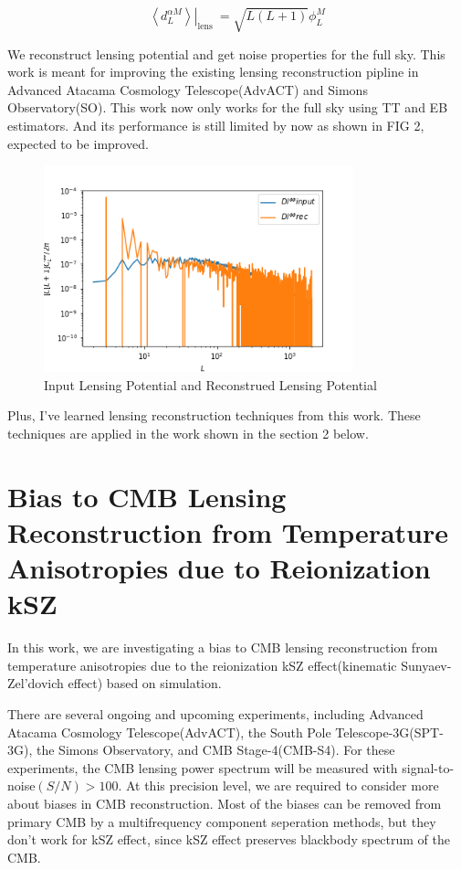 \documentclass[12pt, notitlepage, onecolumn, amsmath, amssymb, aps]{revtex4-1}
\begin{document}
\begin{equation}
  \left.\left\langle d_{L}^{\alpha M}\right\rangle\right|_{\text {lens }}=\sqrt{L(L+1)} \phi_{L}^{M}
\end{equation}

We reconstruct lensing potential and get noise properties for the full sky. This work is meant for improving the existing lensing reconstruction pipline in Advanced Atacama Cosmology Telescope(AdvACT) and Simons Observatory(SO). This work now only works for the full sky using TT and EB estimators. And its performance is still limited by now as shown in FIG 2, expected to be improved.

\begin{figure}[h]
\includegraphics[width=0.8\textwidth]{Dl_phiphi_rec.png}
\caption{Input Lensing Potential and Reconstrued Lensing Potential}
\end{figure}

Plus, I've learned lensing reconstruction techniques from this work. These techniques are applied in the work shown in the section 2 below.



\section{Bias to CMB Lensing Reconstruction from Temperature Anisotropies due to Reionization kSZ}
\label{sec:org093d799}
In this work, we are investigating a bias to CMB lensing reconstruction from temperature anisotropies due to the reionization kSZ effect(kinematic Sunyaev-Zel'dovich effect) based on simulation.

There are several ongoing and upcoming experiments, including Advanced Atacama Cosmology Telescope(AdvACT)\cite{Henderson:2015nzj}, the South Pole Telescope-3G(SPT-3G)\cite{Benson:2014qhw}, the Simons Observatory\cite{Ade:2018sbj}, and CMB Stage-4(CMB-S4)\cite{Abazajian:2016yjj}. For these experiments, the CMB lensing power spectrum will be measured with signal-to-noise\((S/N)>100\). At this precision level, we are required to consider more about biases in CMB reconstruction. Most of the biases can be removed from primary CMB by a multifrequency component seperation methods, but they don't work for kSZ effect, since kSZ effect preserves blackbody spectrum of the CMB.\cite{Smith:2009pn}
\end{document}
